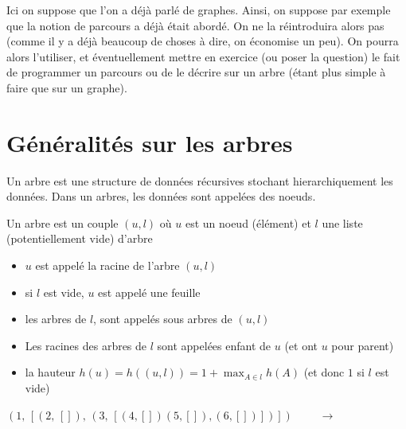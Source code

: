 
\begin{com}
	Ici on suppose que l'on a déjà parlé de graphes. Ainsi, on suppose par exemple que la notion de parcours a déjà était abordé. On ne la réintroduira alors pas (comme il y a déjà beaucoup de choses à dire, on économise un peu). On pourra alors l'utiliser, et éventuellement mettre en exercice (ou poser la question) le fait de programmer un parcours ou de le décrire sur un arbre (étant plus simple à faire que sur un graphe).
\end{com}

\section{Généralités sur les arbres}

Un arbre est une structure de données récursives stochant hierarchiquement les données. Dans un arbres, les données sont appelées des noeuds.

\begin{definition}[arbre]
	Un arbre est un couple $(u, l)$ où $u$ est un noeud (élément) et $l$ une liste (potentiellement vide) d'arbre 
	
	\begin{itemize}[label=$\bullet$]
		\item $u$ est appelé la racine de l'arbre $(u, l)$
		
		\item si $l$ est vide, $u$ est appelé une feuille
		
		\item les arbres de $l$, sont appelés sous arbres de $(u,l)$
		
		\item Les racines des arbres de $l$ sont appelées enfant de $u$ (et ont $u$ pour parent)
		
		\item la hauteur $h(u) = h((u,l)) = 1 + \max_{A\in l} h(A)$ (et donc $1$ si $l$ est vide)
	\end{itemize}
\end{definition}

\begin{example}
	\label{10-ex1}
	$(1, \, [(2, \, []), \, (3, \, [(4,[])  (5, []), (6, [])])])$ $\qquad \longrightarrow \qquad$ 
\end{example}

